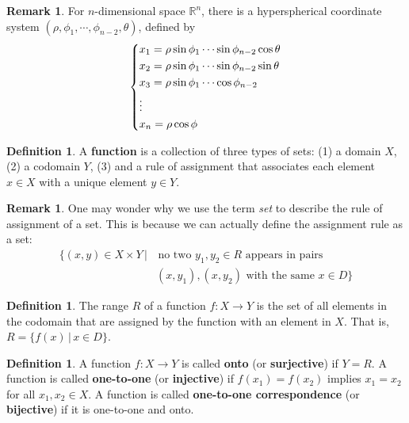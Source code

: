 \documentclass[t]{beamer}
\theoremstyle{plain}
\theoremstyle{definition}
\newtheorem{defn}[thm]{Definition}
\newtheorem{rem}[thm]{Remark}
\begin{document}
\begin{frame}
\begin{rem}
	For $n$-dimensional space $\mathbb R^n$,
	there is a hyperspherical coordinate system
	$(\rho,\phi_1,\cdots,\phi_{n-2},\theta)$, defined by
	$$\begin{dcases}
	x_1 = \rho\sin\phi_1\cdots
		\sin\phi_{n-2}\cos\theta \\
	x_2 = \rho\sin\phi_1\cdots
		\sin\phi_{n-2}\sin\theta \\
	x_3 = \rho\sin\phi_1\cdots\cos\phi_{n-2} \\
	\vdots\\
	x_n = \rho\cos\phi \end{dcases}$$
\end{rem}
\end{frame}

\begin{frame}
\begin{defn}
A \textbf{function} is a collection of three types of sets: (1) a domain $X$, (2) a codomain $Y$, (3) and a rule of assignment that associates each element $x\in X$ with a unique element $y\in Y$. 
\end{defn}
\begin{rem}
One may wonder why we use the term \emph{set} to describe the rule of assignment of a set. This is because we can actually define the assignment rule as a set:
	\begin{align*}
	\{(x,y)\in X\times Y\,|&\, \textrm{no two }y_1,y_2\in R\textrm{ appears in pairs} \\
	 &(x,y_1), (x,y_2)\textrm{ with the same }x\in D\}
	 \end{align*}
\end{rem}
\end{frame}

\begin{frame}
\begin{defn}
The \textrm{range} $R$ of a function $f:X\to Y$ is the set of all elements in the codomain that are assigned by the function with an element in $X$. That is, $R = \{f(x)\,|\,x\in D\}$.
\end{defn}
\begin{defn}
A function $f:X\to Y$ is called \textbf{onto} (or \textbf{surjective}) if $Y=R$. A function is called \textbf{one-to-one} (or \textbf{injective}) if $f(x_1)=f(x_2)$ implies $x_1=x_2$ for all $x_1,x_2\in X$. A function is called \textbf{one-to-one correspondence} (or \textbf{bijective}) if it is one-to-one and onto.
\end{defn}
\end{frame}
\end{document}
